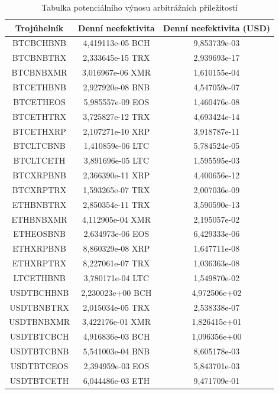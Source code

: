 \documentclass[thesis=B,czech]{FITthesis}[2019/03/21]
\begin{document}
\begin{table}\centering
\caption{Tabulka potenciálního výnosu arbitrážních příležitostí}
\label{table_gains}
\begin{tabular}{|| c | c | c ||}\hline Trojúhelník & Denní neefektivita & Denní neefektivita (USD)\\ [0.5ex]
 \hline\hline BTCBCHBNB & 4,419113e-05 BCH & 9,853739e-03\\ 
 \hline BTCBNBTRX & 2,333645e-15 TRX & 2,939693e-17\\ 
 \hline BTCBNBXMR & 3,016967e-06 XMR & 1,610155e-04\\ 
 \hline BTCETHBNB & 2,927920e-08 BNB & 4,547059e-07\\ 
 \hline BTCETHEOS & 5,985557e-09 EOS & 1,460476e-08\\ 
 \hline BTCETHTRX & 3,725827e-12 TRX & 4,693424e-14\\ 
 \hline BTCETHXRP & 2,107271e-10 XRP & 3,918787e-11\\ 
 \hline BTCLTCBNB & 1,410859e-06 LTC & 5,784524e-05\\ 
 \hline BTCLTCETH & 3,891696e-05 LTC & 1,595595e-03\\ 
 \hline BTCXRPBNB & 2,366390e-11 XRP & 4,400656e-12\\ 
 \hline BTCXRPTRX & 1,593265e-07 TRX & 2,007036e-09\\ 
 \hline ETHBNBTRX & 2,850354e-11 TRX & 3,590590e-13\\ 
 \hline ETHBNBXMR & 4,112905e-04 XMR & 2,195057e-02\\ 
 \hline ETHEOSBNB & 2,634973e-06 EOS & 6,429333e-06\\ 
 \hline ETHXRPBNB & 8,860329e-08 XRP & 1,647711e-08\\ 
 \hline ETHXRPTRX & 8,227061e-07 TRX & 1,036363e-08\\ 
 \hline LTCETHBNB & 3,780171e-04 LTC & 1,549870e-02\\ 
 \hline USDTBCHBNB & 2,230023e+00 BCH & 4,972506e+02\\ 
 \hline USDTBNBTRX & 2,015034e-05 TRX & 2,538338e-07\\ 
 \hline USDTBNBXMR & 3,422176e-01 XMR & 1,826415e+01\\ 
 \hline USDTBTCBCH & 4,916836e-03 BCH & 1,096356e+00\\ 
 \hline USDTBTCBNB & 5,541003e-04 BNB & 8,605178e-03\\ 
 \hline USDTBTCEOS & 2,394959e-03 EOS & 5,843701e-03\\ 
 \hline USDTBTCETH & 6,044486e-03 ETH & 9,471709e-01\\ 

\end{tabular}
\end{table}
\end{document}
